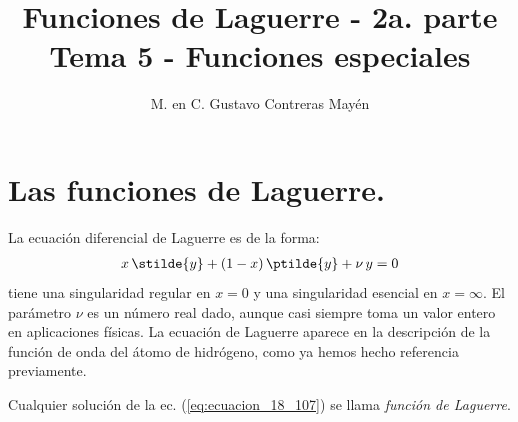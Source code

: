 
\usepackage{apacite}
\title{Funciones de Laguerre - 2a. parte \\ \large {Tema 5 - Funciones especiales} \vspace{-3ex}}
\author{M. en C. Gustavo Contreras Mayén}
\date{ }

\vspace{-4cm}
\maketitle
\fontsize{14}{14}\selectfont
\tableofcontents
\newpage
\section{Las funciones de Laguerre.}
La ecuación diferencial de Laguerre es de la forma:
\begin{align}
x \, \stilde{y} + (1 - x) \, \ptilde{y} + \nu \, y = 0
\label{eq:ecuacion_18_107}
\end{align}
tiene una singularidad regular en $x = 0$ y una singularidad esencial en $x = \infty$. El parámetro $\nu$ es un número real dado, aunque casi siempre toma un valor entero en aplicaciones físicas. La ecuación de Laguerre aparece en la descripción de la función de onda del átomo de hidrógeno, como ya hemos hecho referencia previamente.
\par
Cualquier solución de la ec. (\ref{eq:ecuacion_18_107}) se llama \emph{función de Laguerre}. 
